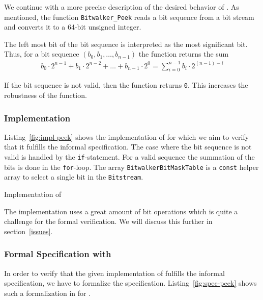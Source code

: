 We continue with a more precise description of the desired behavior of \peek.
As mentioned, the function \texttt{Bitwalker\_Peek} reads a bit sequence from a bit stream
and converts it to a 64-bit unsigned integer.

The left most bit of the bit sequence is interpreted as
the most significant bit.
Thus, for a bit sequence $(b_0, b_1,\ldots,b_{n - 1})$ the function
returns the sum
\begin{align}
    b_0 \cdot 2^{n - 1} + b_1\cdot 2^{n - 2} + \ldots + b_{n-1}\cdot 2^0
    =
    \sum_{i=0}^{n-1} b_i \cdot 2^{(n - 1) - i} 
\end{align}

If the bit sequence is not valid, then the function returns \texttt{0}.
This increases the robustness of the function.

\clearpage
\subsubsection{Implementation}
\label{impl-peek}
 
Listing~\ref{fig:impl-peek} shows the \isoc implementation of \peek 
for which we aim to verify that it fulfills the informal specification.
The case where the bit sequence is not valid is handled by the \texttt{if}-statement.
For a valid sequence the summation of the bits is done in the \texttt{for}-loop.
The array \texttt{BitwalkerBitMaskTable} is a \texttt{const} helper array 
to select a single bit in the \texttt{Bitstream}.

\begin{listing}[hbt]
\begin{minipage}{\textwidth}

\end{minipage}
\caption{\label{fig:impl-peek} Implementation of \peek}
\end{listing}

The implementation uses a great amount of bit operations
which is quite a challenge for the formal verification.
We will discuss this further in section~\ref{issues}.

\clearpage

\subsubsection{Formal Specification with \acsl}
\label{formal-peek}

In order to verify that the given implementation of \peek fulfills 
the informal specification, we have to formalize the specification.
Listing~\ref{fig:spec-peek} shows such a formalization in \acsl for \peek.

